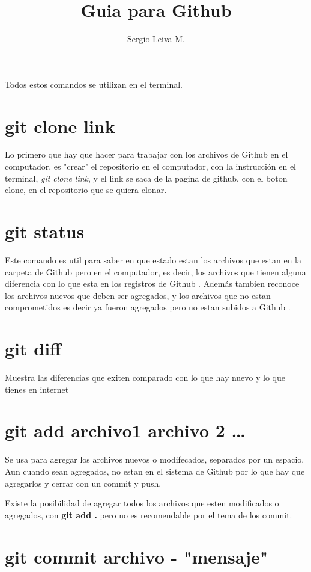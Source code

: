\documentclass[letter,10pt]{article}
\newcommand{\g}{Github }
\begin{document}
\author{Sergio Leiva M.}
\title{\textbf{Guia para \g}}
\maketitle

Todos estos comandos se utilizan en el terminal.

\section{git clone link}
 Lo primero que hay que hacer para trabajar con los archivos de \g  en el computador, es "crear" el repositorio en el computador, con la instrucción en el terminal, \textit{git clone link}, y el link se saca de la pagina de github, con el boton clone, en el repositorio que se quiera clonar.

\section{git status}
 Este comando es util para saber en que estado estan los archivos que estan en la carpeta de \g pero en el computador, es decir, los archivos que tienen alguna diferencia con lo que esta en los registros de \g. Además tambien reconoce los archivos nuevos que deben ser agregados, y los archivos que no estan comprometidos es decir ya fueron agregados pero no estan subidos a \g.
 
\section{git diff}

 Muestra las diferencias que exiten comparado con lo que hay nuevo y lo que tienes en internet
 
\section{git add archivo1 archivo 2 \ldots} 
 
 Se usa para agregar los archivos nuevos o modifecados, separados por un espacio. Aun cuando sean agregados, no estan en el sistema de \g por lo que hay que agregarlos y cerrar con un commit y push.
 
 Existe la posibilidad de agregar todos los archivos que esten modificados o agregados, con \textbf{git add . } pero no es recomendable por el tema de los commit.
 
\section{git commit archivo - "mensaje"} 
\end{document}
